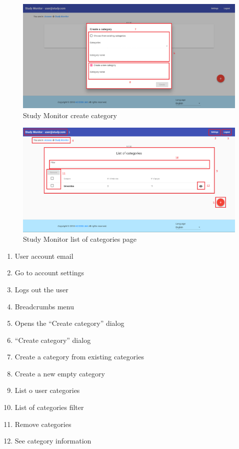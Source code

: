 \begin{figure}[H]
    \centering
    \includegraphics[width=\linewidth]{lib/images/study/study_create_category.png}
    \caption{Study Monitor create category}
    \label{fig:study_list_categories_page_create}
\end{figure}

\begin{figure}[H]
    \centering
    \includegraphics[width=\linewidth]{lib/images/study/study_list_categories_page_full.png}
    \caption{Study Monitor list of categories page}
    \label{fig:study_list_categories_page_full}
\end{figure}

\begin{enumerate}
    \item User account email
    \item Go to account settings
    \item Logs out the user
    \item Breadcrumbs menu
    \item Opens the ``Create category'' dialog
    \item ``Create category'' dialog
    \item Create a category from existing categories
    \item Create a new empty category
    \item List o user categories
    \item List of categories filter
    \item Remove categories
    \item See category information
\end{enumerate}

